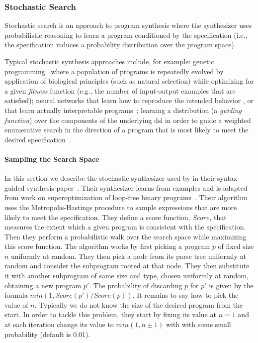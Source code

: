 \subsubsection{Stochastic Search}
\label{sec:stochastic-search}

Stochastic search is an approach to program synthesis where the synthesizer uses
probabilistic reasoning to learn a program conditioned by the specification
(i.e., the specification induces a probability distribution over the program
space).

Typical stochastic synthesis approaches include, for example:
genetic programming~\cite{Weimer:2009:AFP} where a population of programs is
repeatedly evolved by application of biological principles (such as natural
selection) while optimizing for a given \textit{fitness} function (e.g., the
number of input-output examples that are satisfied);
neural networks that learn how to reproduce the intended
behavior%
, or that learn actually interpretable
programs~\cite{Parisotto:2016:NPS};
learning a distribution (a \textit{guiding function}) over the components of
the underlying \gls{dsl} in order to guide a weighted enumerative search in the
direction of a program that is most likely to meet the desired
specification~\cite{Lee:ASP:2018,Balog:2017:DC}. %

\paragraph{Sampling the Search Space}
\label{sec:sampling}

In this section we describe the stochastic synthesizer used by
\citeauthor{Alur:sygus:2013} in their syntax-guided synthesis
paper~\cite{Alur:sygus:2013}.
Their synthesizer learns from examples and is adapted from work on
superoptimization of loop-free binary programs~\cite{Schkufza:2013:SS}.
Their algorithm uses the Metropolis-Hastings procedure to sample expressions
that are more likely to meet the specification.
They define a score function, $Score$, that measures the extent which a given
program is consistent with the specification.
Then they perform a probabilistic walk over the search space while maximizing
this score function.
The algorithm works by first picking a program $p$ of fixed size $n$ uniformly
at random.
They then pick a node from its parse tree uniformly at random and consider the
subprogram rooted at that node.
They then substitute it with another subprogram of same size and type, chosen
uniformly at random, obtaining a new program $p'$.
The probability of discarding $p$ for $p'$ is given by the formula $min(1,
Score(p')/Score(p))$.
It remains to say how to pick the value of $n$.
Typically we do not know the size of the desired program from the start.
In order to tackle this problem, they start by fixing its value at $n = 1$ and
at each iteration change its value to $min(1, n\pm{}1)$ with with some small
probability (default is 0.01).

